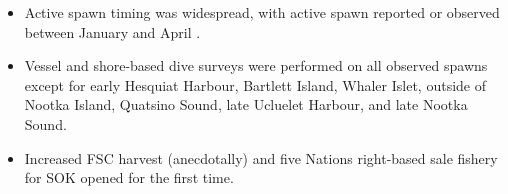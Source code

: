 \begin{itemize}

\item Active spawn timing was widespread, with
active spawn reported or observed between January  and April .

\item Vessel and shore-based dive surveys were performed
on all observed spawns except for
early Hesquiat Harbour, Bartlett Island, Whaler Islet, outside of Nootka Island,
Quatsino Sound, late Ucluelet Harbour, and late Nootka Sound.

\item Increased FSC harvest (anecdotally) and
five Nations right-based sale fishery for SOK opened for the first time.

\end{itemize}